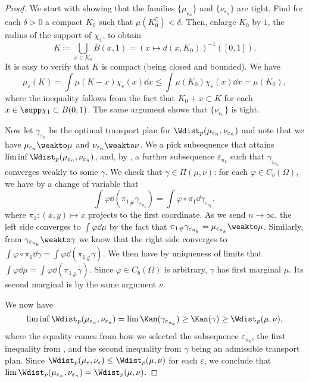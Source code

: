 \documentclass[oneside,reqno,letterpaper]{amsart}
\begin{document}
\begin{proof}
  We start with showing that the families \(\{\mu_{\varepsilon_n}\}\) and \(\{\nu_{\varepsilon_n}\}\) are tight.
  Find for each \(\delta > 0\) a compact \(K_0\) such that \(\mu(K_0^\complement) < \delta\).
  Then, enlarge \(K_0\) by \(1\), the radius of the support of \(\chi_1\), to obtain
  \[
    K
    \coloneqq \bigcup_{x \in K_0} \overline{B}(x, 1)
    = \left( x \mapsto d(x, K_0) \right)^{-1} ([0, 1]).
  \]
  It is easy to verify that \(K\) is compact (being closed and bounded).
  We have
  \[
    \mu_{\varepsilon}(K)
    = \int \mu(K - x) \chi_{\varepsilon}(x) \dd x
    \leq \int \mu(K_0) \chi_{\varepsilon}(x) \dd x
    = \mu(K_0),
  \]
  where the inequality follows from the fact that \(K_0 + x \subset K\) for each \(x \in \supp \chi_1 \subset B(0, 1)\).
  The same argument shows that \(\{\nu_{\varepsilon_n}\}\) is tight.

  Now let \(\gamma_{\varepsilon_n}\) be the optimal transport plan for \(\Wdist_p(\mu_{\varepsilon_n}, \nu_{\varepsilon_n})\) and note that we have \(\mu_{\varepsilon_n} \weakto \mu\) and \(\nu_{\varepsilon_n} \weakto \nu\).
  We a pick subsequence that attains \(\liminf \Wdist_p(\mu_{\varepsilon_n}, \nu_{\varepsilon_n})\), and, by , a further subsequence \(\varepsilon_{n_k}\) such that \(\gamma_{\varepsilon_{n_k}}\) converges weakly to some \(\gamma\).
  We check that \(\gamma \in \Pi(\mu, \nu)\):
  for each \(\varphi \in C_b(\Omega)\), we have by a change of variable that
  \[
    \int \varphi \dd ({\pi_1}_{\#} \gamma_{\varepsilon_{n_k}})
    = \int \varphi \circ \pi_1 \dd \gamma_{\varepsilon_{n_k}},
  \]
  where \(\pi_1: (x, y) \mapsto x\) projects to the first coordinate.
  As we send \(n \to \infty\), the left side converges to \(\int \varphi \dd \mu\) by the fact that \({\pi_1}_{\#} \gamma_{\varepsilon_{n_k}} = \mu_{\varepsilon_{n_k}} \weakto \mu\).
  Similarly, from \(\gamma_{\varepsilon_{n_k}} \weakto \gamma\) we know that the right side converges to \(\int \varphi \circ \pi_1 \dd \gamma = \int \varphi \dd ({\pi_1}_{\#} \gamma)\).
  We then have by uniqueness of limits that \(\int \varphi \dd \mu = \int \varphi \dd ({\pi_1}_{\#} \gamma)\).
  Since \(\varphi \in C_b(\Omega)\) is arbitrary, \(\gamma\) has first marginal \(\mu\).
  Its second marginal is by the same argument \(\nu\).

  We now have
  \[
    \liminf \Wdist_p(\mu_{\varepsilon_n}, \nu_{\varepsilon_n})
    = \lim \Kan(\gamma_{\varepsilon_{n_k}})
    \geq \Kan(\gamma) \geq \Wdist_p(\mu, \nu),
  \]
  where the equality comes from how we selected the subsequence \(\varepsilon_{n_k}\), the first inequality from , and the second inequality from \(\gamma\) being an admissible transport plan.
  Since \(\Wdist_p(\mu_{\varepsilon}, \nu_{\varepsilon}) \leq \Wdist_p(\mu, \nu)\) for each \(\varepsilon\), we conclude that \(\lim \Wdist_p(\mu_{\varepsilon_n}, \nu_{\varepsilon_n}) = \Wdist_p(\mu, \nu)\).
\end{proof}
\end{document}
